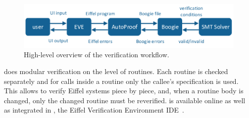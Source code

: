 \begin{figure}[!htb]
\centering
\includegraphics[width=\columnwidth,page=1]{images/drawings.pdf}
\caption{High-level overview of the \AutoProof verification workflow.}
\label{fig:ap-workflow}
\end{figure}

\AutoProof does modular verification on the level of routines. Each routine is checked separately and for calls inside a routine only the callee's specification is used. This allows to verify Eiffel systems piece by piece, and, when a routine body is changed, only the changed routine must be reverified. \AutoProof is available online as well as integrated in \EVE, the Eiffel Verification Environment IDE~\cite{EVE}.


